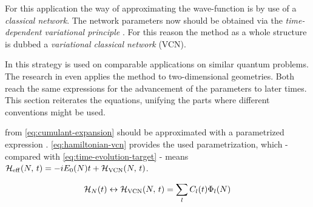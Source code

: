 For this application the way of approximating the wave-function is by use of a \emph{classical network}. 
The network parameters now should be obtained via the \emph{time-dependent variational principle} \cite{originalDerivationTimeDependendVariationalPrinciple}.
For this reason the method as a whole structure is dubbed a \emph{variational classical network} (VCN).

In \cite{variationalClassicalNetworksPaper} this strategy is used on comparable applications on similar quantum problems.
The research in \cite{probabilitySamplingRequirementVCN} even applies the method to two-dimensional geometries.
Both reach the same expressions for the advancement of the parameters to later times.
This section reiterates the equations, unifying the parts where different conventions might be used.

\HNOft from \autoref{eq:cumulant-expansion} should be approximated with a parametrized expression \HvcnOft.
\autoref{eq:hamiltonian-vcn} provides the used parametrization, which - compared with \autoref{eq:time-evolution-target} - means ${\mathcal{H}_\text{eff}}^{}({N},\,t) = -i E_0(N) t + {\mathcal{H}_\text{VCN}}({N},\,t)$.

\begin{equation}
    \label{eq:hamiltonian-vcn}
    \HNOft \leftrightarrow \HvcnOft = \lsum C_l(t) \Phi_l(N)
\end{equation}


\cite{TDVPcomplexPrefactors} %
\cite{complexDifferentiation} %
\cite{probabilitySamplingRequirementVCN} %
\cite{variationalClassicalNetworksPaper} %

